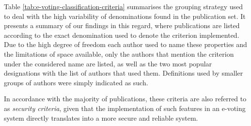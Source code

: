 \documentclass[../access.tex]{subfiles}
\begin{document}
    Table \ref{tab:e-voting-classification-criteria} summarises the grouping strategy used to deal with the high variability of denominations found in the publication set. It presents a summary of our findings in this regard, where publications are listed according to the exact denomination used to denote the criterion implemented. Due to the high degree of freedom each author used to name these properties and the limitations of space available, only the authors that mention the criterion under the considered name are listed, as well as the two most popular designations with the list of authors that used them. Definitions used by smaller groups of authors were simply indicated as such.
    \par
    In accordance with the majority of publications, these criteria are also referred to as \textit{security criteria}, given that the implementation of such features in an e-voting system directly translates into a more secure and reliable system.
    
\end{document}
